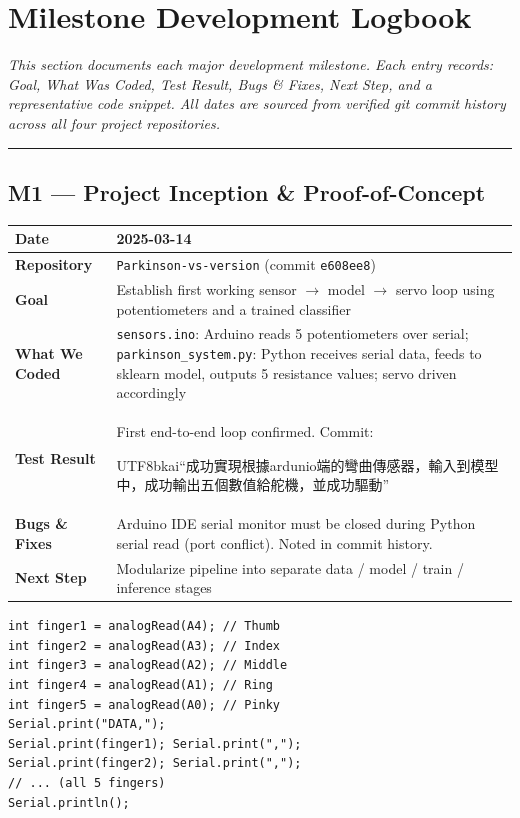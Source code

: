 \documentclass[12pt,a4paper]{article}
\makeatletter
\newenvironment{milestonetable}{%
  \begin{tcolorbox}[colback=codebg, colframe=codeframe, breakable, left=4pt, right=4pt, top=4pt, bottom=4pt]
  \begin{tabularx}{\linewidth}{@{}>{\bfseries}p{3.2cm} X@{}}
  \toprule
}{%
  \bottomrule
  \end{tabularx}
  \end{tcolorbox}
}
\newcommand{\mrow}[2]{\midrule #1 & #2 \\}
\makeatother
\begin{document}
\section{Milestone Development Logbook}

\noindent\textit{This section documents each major development milestone. Each entry records: Goal, What Was Coded, Test Result, Bugs \& Fixes, Next Step, and a representative code snippet. All dates are sourced from verified git commit history across all four project repositories.}

\vspace{0.5em}\hrule\vspace{0.8em}

\subsection{M1 --- Project Inception \& Proof-of-Concept}

\begin{milestonetable}
\mrow{Date}{2025-03-14}
\mrow{Repository}{\texttt{Parkinson-vs-version} (commit \texttt{e608ee8})}
\mrow{Goal}{Establish first working sensor $\rightarrow$ model $\rightarrow$ servo loop using potentiometers and a trained classifier}
\mrow{What We Coded}{\texttt{sensors.ino}: Arduino reads 5 potentiometers over serial; \texttt{parkinson\_system.py}: Python receives serial data, feeds to sklearn model, outputs 5 resistance values; servo driven accordingly}
\mrow{Test Result}{First end-to-end loop confirmed. Commit: \begin{CJK}{UTF8}{bkai}``成功實現根據ardunio端的彎曲傳感器，輸入到模型中，成功輸出五個數值給舵機，並成功驅動''\end{CJK}}
\mrow{Bugs \& Fixes}{Arduino IDE serial monitor must be closed during Python serial read (port conflict). Noted in commit history.}
\mrow{Next Step}{Modularize pipeline into separate data / model / train / inference stages}
\end{milestonetable}

\begin{lstlisting}[style=cppstyle, caption={sensors.ino -- Basic potentiometer read and serial output}]
int finger1 = analogRead(A4); // Thumb
int finger2 = analogRead(A3); // Index
int finger3 = analogRead(A2); // Middle
int finger4 = analogRead(A1); // Ring
int finger5 = analogRead(A0); // Pinky
Serial.print("DATA,");
Serial.print(finger1); Serial.print(",");
Serial.print(finger2); Serial.print(",");
// ... (all 5 fingers)
Serial.println();
\end{lstlisting}
\end{document}
